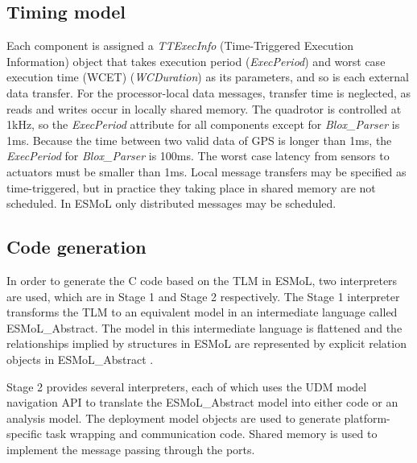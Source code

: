 \documentclass[10pt, conference, compsocconf]{IEEEtran}
\begin{document}
\subsection{Timing model}



Each component is assigned a \emph{TTExecInfo} (Time-Triggered Execution Information) object that takes execution period (\emph{ExecPeriod}) and worst case execution time (WCET) (\emph{WCDuration}) as its parameters, and so is each external data transfer. For the processor-local data messages, transfer time is neglected, as reads and writes occur in locally shared memory. The quadrotor is controlled at 1kHz, so the \emph{ExecPeriod} attribute for all components except for \emph{Blox\_Parser} is 1ms. Because the time between two valid data of GPS is longer than 1ms, the \emph{ExecPeriod} for \emph{Blox\_Parser} is 100ms. The worst case latency from sensors to actuators must be smaller than 1ms. Local message transfers may be specified as time-triggered, but in practice they taking place in shared memory are not scheduled. In ESMoL only distributed messages may be scheduled.
 

\subsection{Code generation}

In order to generate the C code based on the TLM in ESMoL, two interpreters are used, which are in Stage 1 and Stage 2 respectively. The Stage 1 interpreter transforms the TLM to an equivalent model in an intermediate language called ESMoL\_Abstract. The model in this intermediate language is flattened and the relationships implied by structures in ESMoL are represented by explicit relation objects in ESMoL\_Abstract \cite{modeling:esmol}.

Stage 2 provides several interpreters, each of which uses the UDM model navigation API to translate the ESMoL\_Abstract model into either code or an analysis model. The deployment model objects are used to generate platform-specific task wrapping and communication code. Shared memory is used to implement the message passing through the ports.
\end{document}
